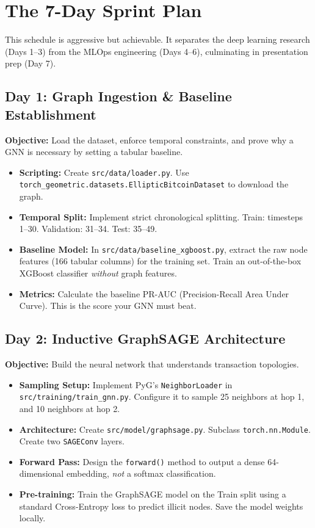 \documentclass[12pt,a4paper]{article}
\newcommand{\todo}{\ding{113}}
\begin{document}
\section{The 7-Day Sprint Plan}

This schedule is aggressive but achievable. It separates the deep learning research (Days 1--3) from the MLOps engineering (Days 4--6), culminating in presentation prep (Day 7).

\subsection{Day 1: Graph Ingestion \& Baseline Establishment}
\textbf{Objective:} Load the dataset, enforce temporal constraints, and prove why a GNN is necessary by setting a tabular baseline.

\begin{itemize}
    \item[\todo] \textbf{Scripting:} Create \texttt{src/data/loader.py}. Use \texttt{torch\_geometric.datasets.EllipticBitcoinDataset} to download the graph.
    \item[\todo] \textbf{Temporal Split:} Implement strict chronological splitting. Train: timesteps 1--30. Validation: 31--34. Test: 35--49.
    \item[\todo] \textbf{Baseline Model:} In \texttt{src/data/baseline\_xgboost.py}, extract the raw node features (166 tabular columns) for the training set. Train an out-of-the-box XGBoost classifier \textit{without} graph features. 
    \item[\todo] \textbf{Metrics:} Calculate the baseline PR-AUC (Precision-Recall Area Under Curve). This is the score your GNN must beat.
\end{itemize}

\subsection{Day 2: Inductive GraphSAGE Architecture}
\textbf{Objective:} Build the neural network that understands transaction topologies.

\begin{itemize}
    \item[\todo] \textbf{Sampling Setup:} Implement PyG's \texttt{NeighborLoader} in \texttt{src/training/train\_gnn.py}. Configure it to sample 25 neighbors at hop 1, and 10 neighbors at hop 2.
    \item[\todo] \textbf{Architecture:} Create \texttt{src/model/graphsage.py}. Subclass \texttt{torch.nn.Module}. Create two \texttt{SAGEConv} layers.
    \item[\todo] \textbf{Forward Pass:} Design the \texttt{forward()} method to output a dense 64-dimensional embedding, \textit{not} a softmax classification. 
    \item[\todo] \textbf{Pre-training:} Train the GraphSAGE model on the Train split using a standard Cross-Entropy loss to predict illicit nodes. Save the model weights locally.
\end{itemize}
\end{document}
